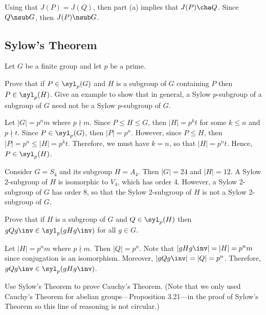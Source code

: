 \begin{solalph}
	Using that $J(P) = J(Q)$, then part (a) implies that $J(P) \cha Q$. Since $Q \nsub G$, then $J(P) \nsub G$.
\end{solalph}

\newpage

\subsection{Sylow's Theorem}

Let $G$ be a finite group and let $p$ be a prime.

\begin{exercise}\label{ex4.5.1}
	Prove that if $P \in \syl_p(G)$ and $H$ is a subgroup of $G$ containing $P$ then $P \in \syl_p(H)$. Give an example to show that in general, a Sylow $p$-subgroup of a subgroup of $G$ need not be a Sylow $p$-subgroup of $G$.
\end{exercise}

\begin{sol}
	Let $|G| = p^n m$ where $p \nmid m$. Since $P \leq H \leq G$, then $|H| = p^k t$ for some $k \leq n$ and $p \nmid t$. Since $P \in \syl_p(G)$, then $|P| = p^n$. However, since $P \leq H$, then $|P| = p^n \leq |H| = p^k t$. Therefore, we must have $k = n$, so that $|H| = p^n t$. Hence, $P \in \syl_p(H)$.

	Consider $G = S_4$ and its subgroup $H = A_4$. Then $|G| = 24$ and $|H| = 12$. A Sylow 2-subgroup of $H$ is isomorphic to $V_4$, which has order 4. However, a Sylow 2-subgroup of $G$ has order 8, so that the Sylow 2-subgroup of $H$ is not a Sylow 2-subgroup of $G$.
\end{sol}

\begin{exercise}\label{ex4.5.2}
	Prove that if $H$ is a subgroup of $G$ and $Q \in \syl_p(H)$ then $gQg\inv \in \syl_p(gHg\inv)$ for all $g \in G$.
\end{exercise}

\begin{sol}
	Let $|H| = p^n m$ where $p \nmid m$. Then $|Q| = p^n$. Note that $|gHg\inv| = |H| = p^n m$ since conjugation is an isomorphism. Moreover, $|gQg\inv| = |Q| = p^n$. Therefore, $gQg\inv \in \syl_p(gHg\inv)$.
\end{sol}

\begin{exercise}\label{ex4.5.3}
	Use Sylow's Theorem to prove Cauchy's Theorem. (Note that we only used Cauchy's Theorem for abelian groups---Proposition 3.21---in the proof of Sylow's Theorem so this line of reasoning is not circular.)
\end{exercise}

